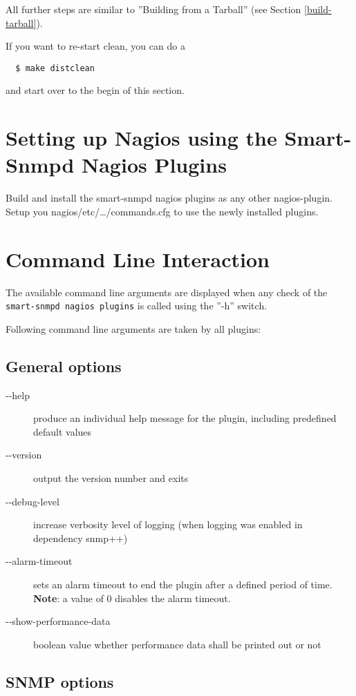 All further steps are similar to ''Building from a Tarball'' (see
Section \ref{build-tarball}).

If you want to re-start clean, you can do a

\begin{verbatim}
  $ make distclean
\end{verbatim}

and start over to the begin of this section.

\section{Setting up Nagios using the Smart-Snmpd Nagios Plugins}

Build and install the smart-snmpd nagios plugins as any other nagios-plugin.
Setup you nagios/etc/\ldots/commands.cfg to use the newly installed
plugins.

\section{Command Line Interaction}

The available command line arguments are displayed when any check of the
\texttt{smart-snmpd nagios plugins} is called using the ''-h'' switch.

Following command line arguments are taken by all plugins:

\subsection{General options}

\begin{description}
\item[-\--help] produce an individual help message for the plugin, including predefined default values
\item[-\--version] output the version number and exits
\item[-\--debug-level] increase verbosity level of logging (when logging was enabled in dependency snmp++)
\item[-\--alarm-timeout] sets an alarm timeout to end the plugin after a defined period of time. \textbf{Note}: a value of 0 disables the alarm timeout.
\item[-\--show-performance-data] boolean value whether performance data shall be printed out or not
\end{description}

\subsection{SNMP options}

